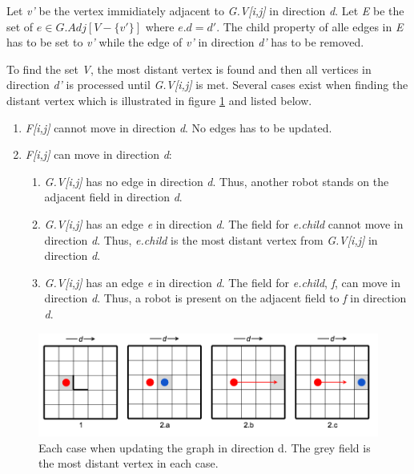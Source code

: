 \documentclass[]{article}
\providecommand{\tightlist}{%
  \setlength{\itemsep}{0pt}\setlength{\parskip}{0pt}}
\begin{document}
Let \emph{v'} be the vertex immidiately adjacent to \emph{G.V{[}i,j{]}}
in direction \emph{d}. Let \emph{E} be the set of
\(e \in G.Adj[V-\{v'\}]\) where \(e.d = d'\). The child property of alle
edges in \emph{E} has to be set to \emph{v'} while the edge of \emph{v'}
in direction \emph{d'} has to be removed.

To find the set \emph{V}, the most distant vertex is found and then all
vertices in direction \emph{d'} is processed until \emph{G.V{[}i,j{]}}
is met. Several cases exist when finding the distant vertex which is
illustrated in figure \ref{fig:graph_states} and listed below.

\begin{enumerate}
\def\labelenumi{\arabic{enumi}.}
\tightlist
\item
  \emph{F{[}i,j{]}} cannot move in direction \emph{d}. No edges has to
  be updated.
\item
  \emph{F{[}i,j{]}} can move in direction \emph{d}:

  \begin{enumerate}
  \def\labelenumii{\alph{enumii}.}
  \tightlist
  \item
    \emph{G.V{[}i,j{]}} has no edge in direction \emph{d}. Thus, another
    robot stands on the adjacent field in direction \emph{d}.
  \item
    \emph{G.V{[}i,j{]}} has an edge \emph{e} in direction \emph{d}. The
    field for \emph{e.child} cannot move in direction \emph{d}. Thus,
    \emph{e.child} is the most distant vertex from \emph{G.V{[}i,j{]}}
    in direction \emph{d}.
  \item
    \emph{G.V{[}i,j{]}} has an edge \emph{e} in direction \emph{d}. The
    field for \emph{e.child}, \emph{f}, can move in direction \emph{d}.
    Thus, a robot is present on the adjacent field to \emph{f} in
    direction \emph{d}.
  \end{enumerate}
\end{enumerate}

\begin{figure}[htb]
\centering
\includegraphics[width=1\linewidth]{img/graph_states.png}
\caption{Each case when updating the graph in direction d. The grey field is the most distant vertex in each case.}
\label{fig:graph_states}
\end{figure}
\end{document}
